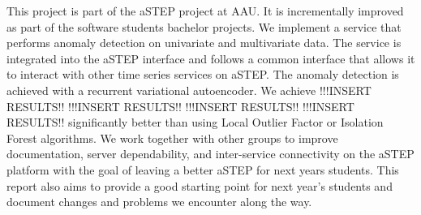 This project is part of the aSTEP project at AAU. It is incrementally improved as part of the software students bachelor projects. 
We implement a service that performs anomaly detection on univariate and multivariate data. The service is integrated into the aSTEP interface and follows a common interface that allows it to interact with other time series services on aSTEP.
The anomaly detection is achieved with a recurrent variational autoencoder.
We achieve !!!INSERT RESULTS!!  !!!INSERT RESULTS!!  !!!INSERT RESULTS!!  !!!INSERT RESULTS!! significantly better than using Local Outlier Factor or Isolation Forest algorithms.
We work together with other groups to improve documentation, server dependability, and inter-service connectivity on the aSTEP platform with the goal of leaving a better aSTEP for next years students.
This report also aims to provide a good starting point for next year's students and document changes and problems we encounter along the way.